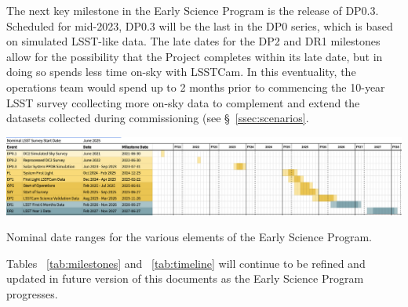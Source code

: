 The next key milestone in the Early Science Program is the release of DP0.3. 
Scheduled for mid-2023, DP0.3 will be the last in the DP0 series, which is based on simulated LSST-like data. 
The late dates for the DP2 and DR1 milestones allow for the possibility that the Project completes within its late date, but in doing so spends less time on-sky with LSSTCam.
In this eventuality, the operations team would spend up to 2 months prior to commencing the 10-year LSST survey ccollecting more on-sky data to complement and extend the datasets collected during commissioning (see \S~\ref{ssec:scenarios}. 
\begin{table}[ht]
\centering
\includegraphics[width=\linewidth]{figures/DPR-timeline}
\caption{Nominal date ranges for the various elements of the Early Science Program.}
\label{tab:timeline}
\end{table}

Tables ~\ref{tab:milestones} and ~\ref{tab:timeline} will continue to be refined and updated in future version of this documents as the Early Science Program progresses.
